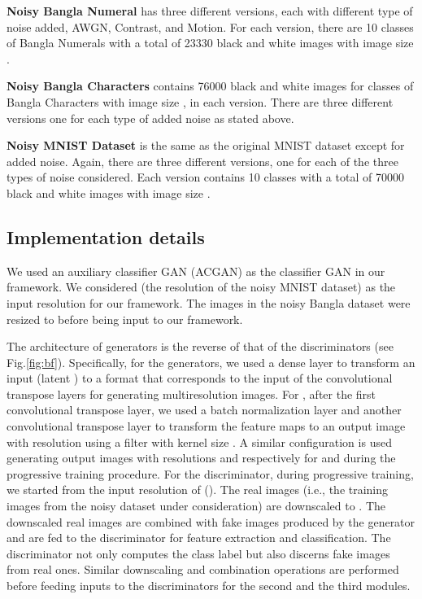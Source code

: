 \documentclass[runningheads]{llncs}
\begin{document}
\textbf{Noisy Bangla Numeral} has three different versions, each with different type of noise added, AWGN, Contrast, and Motion. For each version, there are 10 classes of Bangla Numerals with a total of 23330 black  and white images with image size .

\textbf{Noisy Bangla Characters} contains 76000 black  and white images for  classes of Bangla Characters with image size , in each version. There are  three different versions one for each type of added noise as stated above.

\textbf{Noisy MNIST Dataset} is the  same as the  original MNIST dataset except  for added noise. Again, there are three different versions, one for each of the three types of noise considered.  Each version  contains 10 classes with a total of 70000 black and  white images with image size .

\subsection{Implementation details}


We used an  auxiliary classifier GAN (ACGAN) \cite{google} as the classifier GAN in our framework.  We considered  (the resolution of the noisy MNIST dataset)  as the input resolution for our framework.  The images in the noisy Bangla  dataset were resized to  before being input to our framework. 


The architecture of generators is the reverse of that of the discriminators (see Fig.\ref{fig:bf}).  
Specifically, for  the generators, we used a dense layer to transform an input (latent ) to  a  format that corresponds to the input of the  convolutional transpose layers for generating multiresolution images. For ,  after the first convolutional transpose layer, we used a batch normalization layer and another convolutional transpose layer to transform  the feature maps to an output image with resolution   using a filter with kernel size . A similar configuration is used  generating output images with resolutions   and   respectively for  and  during the  progressive training procedure. For the discriminator, during progressive training, we started from the input resolution of  ().  The real images (i.e., the training images from the noisy dataset under consideration) are downscaled to .      The downscaled  real images are combined   with fake images  produced by the  generator and are fed to the discriminator for feature extraction and classification. The discriminator not only computes the class label but also discerns fake images from real ones. Similar downscaling and combination operations are performed before feeding  inputs to the discriminators for the second and the third modules. 
\end{document}
